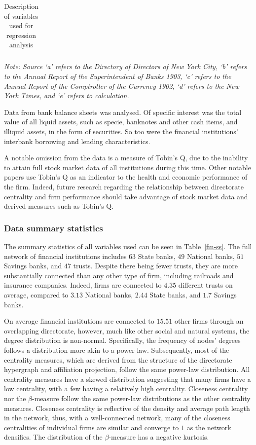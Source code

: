 \begin{table}[t!]
{\begin{tabular}{lll}
\bottomrule
\end{tabular}
}
\begin{flushleft}
\emph{Note: Source `a' refers to the Directory of Directors of New York City, `b' refers to the Annual Report of the Superintendent of Banks 1903, `c' refers to the Annual Report of the Comptroller of the Currency 1902, `d' refers to the New York Times, and `e' refers to calculation.}
\end{flushleft}
\caption{Description of variables used for regression analysis}
\label{vardesc}
\end{table}

Data from bank balance sheets was analysed. Of specific interest was the total value of all liquid assets, such as specie, banknotes and other cash items, and illiquid assets, in the form of securities. So too were the financial institutions' interbank borrowing and lending characteristics.

A notable omission from the data is a measure of Tobin's Q, due to the inability to attain full stock market data of all institutions during this time. Other notable papers use Tobin's Q as an indicator to the health and economic performance of the firm. Indeed, future research regarding the relationship between directorate centrality and firm performance should take advantage of stock market data and derived measures such as Tobin's Q.

\subsubsection*{Data summary statistics}

The summary statistics of all variables used can be seen in Table~\ref{fin-ss}. The full network of financial institutions includes $63$ State banks, $49$ National banks, $51$ Savings banks, and $47$ trusts. Despite there being fewer trusts, they are more substantially connected than any other type of firm, including railroads and insurance companies. Indeed, firms are connected to $4.35$ different trusts on average, compared to $3.13$ National banks, $2.44$ State banks, and $1.7$ Savings banks.

On average financial institutions are connected to $15.51$ other firms through an overlapping directorate, however, much like other social and natural systems, the degree distribution is non-normal. Specifically, the frequency of nodes' degrees follows a distribution more akin to a power-law. Subsequently, most of the centrality measures, which are derived from the structure of the directorate hypergraph and affiliation projection, follow the same power-law distribution. All centrality measures have a skewed distribution suggesting that many firms have a low centrality, with a few having a relatively high centrality. Closeness centrality nor the $\beta$-measure follow the same power-law distributions as the other centrality measures. Closeness centrality is reflective of the density and average path length in the network, thus, with a well-connected network, many of the closeness centralities of individual firms are similar and converge to $1$ as the network densifies. The distribution of the $\beta$-measure has a negative kurtosis.


